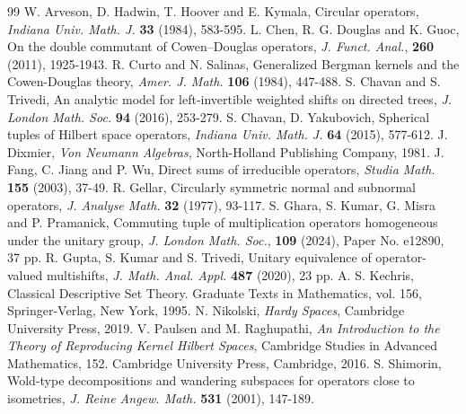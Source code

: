 \documentclass[10pt,a4paper]{amsart}
\begin{document}
\begin{thebibliography}{99}
 W. Arveson, D. Hadwin, T. Hoover and E. Kymala, Circular operators, {\it Indiana Univ. Math. J.} {\bf 33} (1984), 583-595.
 L. Chen, R. G. Douglas and K. Guoc, On the double commutant of Cowen–Douglas operators, {\it J. Funct. Anal.}, {\bf 260} (2011), 1925-1943.
 R. Curto and N. Salinas, Generalized Bergman kernels and the Cowen-Douglas theory, {\it Amer. J. Math.} {\bf 106} (1984), 447-488.
 S. Chavan and S. Trivedi, An analytic model for left-invertible weighted shifts on directed trees, {\it J. London Math. Soc.} {\bf 94} (2016), 253-279.
 S. Chavan, D. Yakubovich, Spherical tuples of Hilbert space operators, {\it Indiana Univ. Math. J.} {\bf 64} (2015), 577-612.
 J. Dixmier, {\it Von Neumann Algebras}, North-Holland Publishing Company, 1981.
 J. Fang, C. Jiang and P. Wu, Direct sums of irreducible operators, {\it Studia Math.} {\bf 155} (2003), 37-49.
 R. Gellar, Circularly symmetric normal and subnormal operators, {\it J. Analyse Math.} {\bf 32} (1977), 93-117.
 S. Ghara, S. Kumar, G. Misra and P. Pramanick, Commuting tuple of multiplication operators homogeneous under the unitary group, {\it J. London Math. Soc.}, {\bf 109} (2024), Paper No. e12890, 37 pp.
 R. Gupta, S. Kumar and S. Trivedi, Unitary equivalence of operator-valued multishifts, {\it J. Math. Anal. Appl.} {\bf 487} (2020), 23 pp.
 A. S. Kechris, Classical Descriptive Set Theory. Graduate Texts in Mathematics, vol. 156, Springer-Verlag, New York, 1995.
 N. Nikolski, {\it Hardy Spaces}, Cambridge University Press, 2019.
 V. Paulsen and M. Raghupathi, {\it An Introduction to the Theory of Reproducing Kernel Hilbert Spaces}, Cambridge Studies in Advanced Mathematics, 152. Cambridge University Press, Cambridge, 2016.
 S. Shimorin, Wold-type decompositions and wandering subspaces for operators close to isometries, {\it J. Reine Angew. Math.} {\bf 531} (2001), 147-189.
\end{thebibliography}
\end{document}
